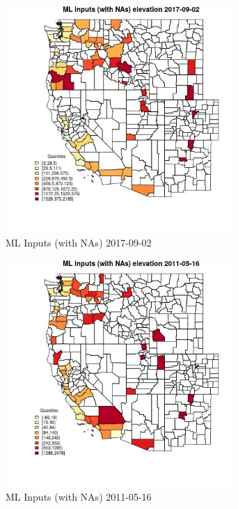 \begin{figure} 
\centering  
\includegraphics[width=0.77\textwidth]{Code_Outputs/Report_ML_input_PM25_Step4_part_e_de_duplicated_aveswNAs_CountyelevationMean2017-09-02_2017-09-02.jpg} 
\caption{\label{fig:Report_ML_input_PM25_Step4_part_e_de_duplicated_aveswNAsCountyelevationMean2017-09-02_2017-09-02}ML Inputs (with NAs) 2017-09-02} 
\end{figure} 
 

\begin{figure} 
\centering  
\includegraphics[width=0.77\textwidth]{Code_Outputs/Report_ML_input_PM25_Step4_part_e_de_duplicated_aveswNAs_CountyelevationMean2011-05-16_2011-05-16.jpg} 
\caption{\label{fig:Report_ML_input_PM25_Step4_part_e_de_duplicated_aveswNAsCountyelevationMean2011-05-16_2011-05-16}ML Inputs (with NAs) 2011-05-16} 
\end{figure} 
 

